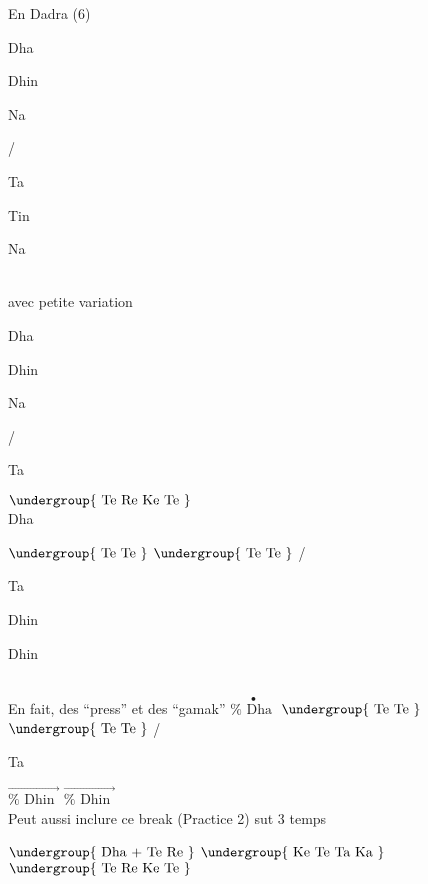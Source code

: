 \documentclass[12pt]{article}
\newcommand{\matra}[1]{$\undergroup{\text{#1}}$}
\newcommand{\gamak}[1]{$\overrightarrow{\text{#1}}$}
\newcommand{\press}[1]{$\overset{\bullet}{\text{#1}}$}
\newif\ifdoigt
\newcommand{\bol}[2]{%
  \ifdoigt
  \pbox[b]{2cm}
       {\hspace*{\fill}{\scriptsize #2}\\#1}
  \else
      {#1}
  \fi
}%
\def\K{\bol{Ke}{}}
\def\Ka{\bol{Ka}{}}
\def\To{\bol{Te}{gn1}}
\def\Ro{\bol{Re}{gn1}}
\def\Tt{\bol{Te}{g3}}
\def\N{\bol{Na}{k}}
\def\Ta{\bol{Ta}{}}
\def\Tin{\bol{Tin}{sn1}}
\def\Da{\bol{Dha}{k/2}}
\def\Di{\bol{Dhin}{gsn1/2}}
\def\Ka{\bol{Ka}{}}
\def\sep{ / }
\def\sepnl{\\}
\newcommand{\double}[1]{%
  #1\bol{+}{}
  }%
\def\TRKT{\matra{\Tt \Ro \K \Tt}}
\begin{document}
En Dadra (6)

\Da \Di \N \sep \Ta \Tin \N \sepnl

avec petite variation

\Da \Di \N \sep \Ta \TRKT \sepnl


\Da \matra{\Tt \To} \matra{\Tt \To}  \sep \Ta \Di \Di \sepnl

\doigtfalse
En fait, des ``press'' et des ``gamak''
\press{\Da} \matra{\Tt \To} \matra{\Tt \To}  \sep \Ta \gamak{\Di} \gamak{\Di} \sepnl

Peut aussi inclure ce break (Practice 2) sut 3 temps

\matra{\double{\Da}  \Tt \Ro} \matra{\K \Tt \Ta \Ka} \matra{\Tt \Ro \K \Tt} \sepnl

\end{document}

